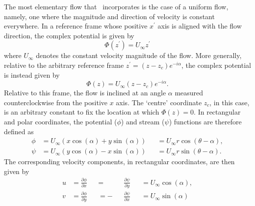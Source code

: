 \documentclass[10pt, twoside]{book}
\begin{document}
			The most elementary flow that \MATfluids\ incorporates is the case of a uniform flow, namely, one where the magnitude and direction of velocity is constant everywhere. In a reference frame whose positive $x^{\prime}$ axis is aligned with the flow direction, the complex potential is given by
			\begin{equation}
				\label{eq:UniformFlowPHI0}
				\Phi\left(z^{\prime}\right) = U_{\infty}z^{\prime}
			\end{equation}
			where $U_{\infty}$ denotes the constant velocity magnitude of the flow. More generally, relative to the arbitrary reference frame $z^{\prime} = \left(z - z_c\right)e^{-i\alpha}$, the complex potential is instead given by
			\begin{equation}
				\label{eq:UniformFlowPHI}
				\Phi\left(z\right) = U_{\infty}\left(z - z_c\right)e^{-i\alpha}.
			\end{equation}
			Relative to this frame, the flow is inclined at an angle $\alpha$ measured counterclockwise from the positive $x$ axis. The `centre' coordinate $z_c$, in this case, is an arbitrary constant to fix the location at which $\Phi\left(z\right) = 0$. In rectangular and polar coordinates, the potential ($\phi$) and stream ($\psi$) functions are therefore defined as
			\begin{subequations}
				\label{eq:UniformFlowPhiPsi}
				\begin{alignat}{2}
					\phi &= U_{\infty}\left(x\cos\left(\alpha\right) + y\sin\left(\alpha\right)\right) &&= U_{\infty}r\cos\left(\theta-\alpha\right),\label{eq:UniformFlowPhi}\\
					\psi &= U_{\infty}\left(y\cos\left(\alpha\right) - x\sin\left(\alpha\right)\right) &&= U_{\infty}r\sin\left(\theta-\alpha\right).\label{eq:UniformFlowPsi}
				\end{alignat}
			\end{subequations}
			The corresponding velocity components, in rectangular coordinates, are then given by
			\begin{subequations}
				\label{eq:UniformFlowVel}
				\begin{alignat}{4}
					u &= \frac{\partial\phi}{\partial x} &&=  &&\frac{\partial\psi}{\partial y} &&= U_{\infty}\cos\left(\alpha\right),\label{eq:UniformFlowVelU}\\
					v &= \frac{\partial\phi}{\partial y} &&= -&&\frac{\partial\psi}{\partial x} &&= U_{\infty}\sin\left(\alpha\right)\label{eq:UniformFlowVelV}
				\end{alignat}
			\end{subequations}
\end{document}
